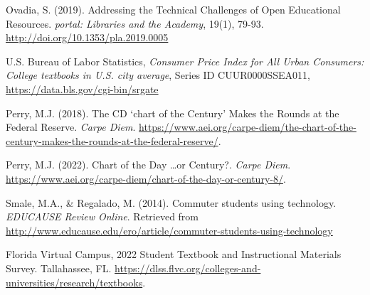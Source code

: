 \documentclass[11pt]{article}
\begin{document}
\begin{thebibliography}{99}
   Ovadia, S. (2019). Addressing the Technical Challenges of Open Educational Resources.  {\em portal: Libraries and the Academy}, 19(1), 79-93. \href{http://doi.org/10.1353/pla.2019.0005}{http://doi.org/10.1353/pla.2019.0005}

   U.S. Bureau of Labor Statistics, {\em Consumer Price Index for All Urban Consumers: College textbooks in U.S. city average}, Series ID CUUR0000SSEA011, \href{https://data.bls.gov/cgi-bin/srgate}{https://data.bls.gov/cgi-bin/srgate}

   Perry, M.J. (2018). The CD `chart of the Century' Makes the Rounds at the Federal Reserve. {\em Carpe Diem}. \href{https://www.aei.org/carpe-diem/the-chart-of-the-century-makes-the-rounds-at-the-federal-reserve/}{https://www.aei.org/carpe-diem/the-chart-of-the-century-makes-the-rounds-at-the-federal-reserve/}.

   Perry, M.J. (2022). Chart of the Day \ldots or Century?. {\em Carpe Diem}. \href{https://www.aei.org/carpe-diem/chart-of-the-day-or-century-8/}{https://www.aei.org/carpe-diem/chart-of-the-day-or-century-8/}.

   Smale, M.A., \& Regalado, M. (2014). Commuter students using technology. {\em EDUCAUSE Review Online}. Retrieved from \href{http://www.educause.edu/ero/article/commuter-students-using-technology}{http://www.educause.edu/ero/article/commuter-students-using-technology}

   Florida Virtual Campus, 2022 Student Textbook and Instructional Materials Survey. Tallahassee, FL. \href{https://dlss.flvc.org/colleges-and-universities/research/textbooks}{https://dlss.flvc.org/colleges-and-universities/research/textbooks}.

\end{thebibliography}
\end{document}
